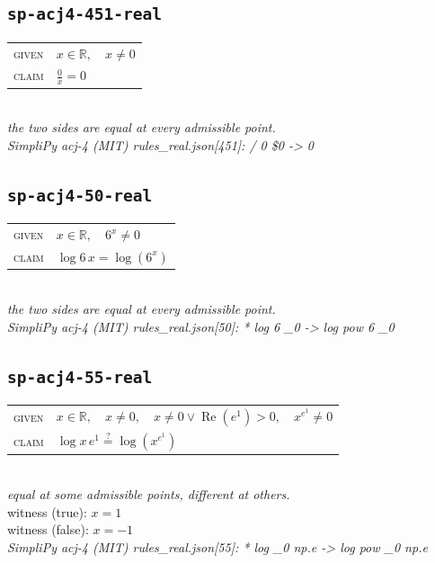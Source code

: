 \documentclass[11pt]{article}
\begin{document}
\subsection*{\texttt{sp-acj4-451-real}}
\begin{tabular}{@{}l@{\quad}l@{}}
\textsc{given} & $x \in \mathbb{R},\quad x \neq 0$ \\[4pt]
\textsc{claim} & $\displaystyle \frac{0}{x} = 0$ \\
\end{tabular}\\[2pt]
{\small\emph{the two sides are equal at every admissible point.}}\\
\emph{SimpliPy acj-4 (MIT) rules\_real.json[451]: / 0 \$0  ->  0}\\

\subsection*{\texttt{sp-acj4-50-real}}
\begin{tabular}{@{}l@{\quad}l@{}}
\textsc{given} & $x \in \mathbb{R},\quad 6^{x} \neq 0$ \\[4pt]
\textsc{claim} & $\displaystyle \log 6 \, x = \log\left(6^{x}\right)$ \\
\end{tabular}\\[2pt]
{\small\emph{the two sides are equal at every admissible point.}}\\
\emph{SimpliPy acj-4 (MIT) rules\_real.json[50]: * log 6 \_0  ->  log pow 6 \_0}\\

\subsection*{\texttt{sp-acj4-55-real}}
\begin{tabular}{@{}l@{\quad}l@{}}
\textsc{given} & $x \in \mathbb{R},\quad x \neq 0,\quad x \neq 0 \lor \operatorname{Re}\left(e^{1}\right) > 0,\quad x^{e^{1}} \neq 0$ \\[4pt]
\textsc{claim} & $\displaystyle \log x \, e^{1} \overset{?}{=} \log\left(x^{e^{1}}\right)$ \\
\end{tabular}\\[2pt]
{\small\emph{equal at some admissible points, different at others.}}\\
{\footnotesize\color{gray}witness (true): $x = 1$}\\
{\footnotesize\color{gray}witness (false): $x = -1$}\\
\emph{SimpliPy acj-4 (MIT) rules\_real.json[55]: * log \_0 np.e  ->  log pow \_0 np.e}\\
\end{document}
